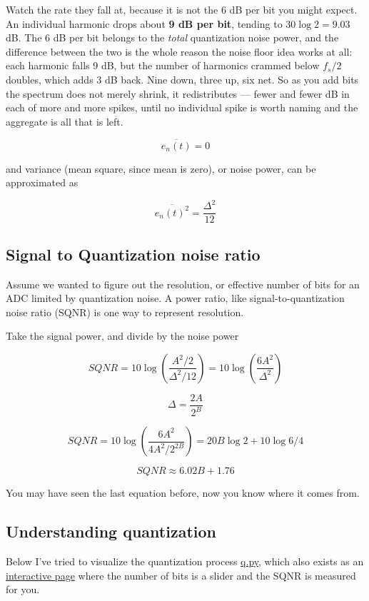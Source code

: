 Watch the rate they fall at, because it is not the 6 dB per bit you
might expect. An individual harmonic drops about \textbf{9 dB per bit},
tending to \(30\log 2 = 9.03\) dB. The 6 dB per bit belongs to the
\emph{total} quantization noise power, and the difference between the
two is the whole reason the noise floor idea works at all: each harmonic
falls 9 dB, but the number of harmonics crammed below \(f_s/2\) doubles,
which adds 3 dB back. Nine down, three up, six net. So as you add bits
the spectrum does not merely shrink, it redistributes --- fewer and
fewer dB in each of more and more spikes, until no individual spike is
worth naming and the aggregate is all that is left.

\[\overline{e_n(t)} = 0 \]

and variance (mean square, since mean is zero), or noise power, can be
approximated as

\[\overline{e_n(t)^2} = \frac{\Delta^2}{12}\]

\subsection{Signal to Quantization noise
ratio}\label{signal-to-quantization-noise-ratio}

Assume we wanted to figure out the resolution, or effective number of
bits for an ADC limited by quantization noise. A power ratio, like
signal-to-quantization noise ratio (SQNR) is one way to represent
resolution.

Take the signal power, and divide by the noise power

\[ SQNR = 10 \log\left(\frac{A^2/2}{\Delta^2/12}\right) = 10 \log\left(\frac{6 A^2}{\Delta^2}\right) \]

\[ \Delta = \frac{2A}{2^B}\]

\[ SQNR = 10 \log\left(\frac{6 A^2}{4 A^2/2^{2B}}\right) = 20 B \log 2 + 10 \log 6/4\]

\[ SQNR  \approx 6.02 B + 1.76\]

You may have seen the last equation before, now you know where it comes
from.

\subsection{Understanding
quantization}\label{understanding-quantization}

Below I've tried to visualize the quantization process
\href{https://github.com/wulffern/aic2026/blob/main/ex/q.py}{q.py},
which also exists as an
\href{https://wulffern.github.io/aic2026/assets/examples/quantization.html}{interactive
page} where the number of bits is a slider and the SQNR is measured for
you.

